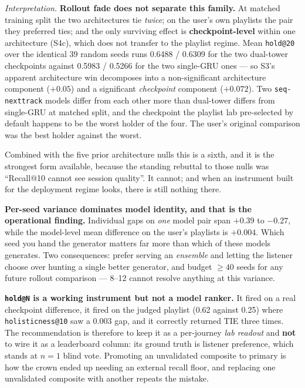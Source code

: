 \documentclass[11pt]{article}
\begin{document}
\emph{Interpretation.} \textbf{Rollout fade does not separate this family.} At
matched training split the two architectures tie \emph{twice}; on the user's own
playlists the pair they preferred ties; and the only surviving effect is
\textbf{checkpoint-level} within one architecture (S4c), which does not transfer to
the playlist regime. Mean \texttt{hold@20} over the identical \num{39} random
seeds runs \num{0.6488} / \num{0.6309} for the two dual-tower checkpoints against
\num{0.5983} / \num{0.5266} for the two single-GRU ones --- so S3's apparent
architecture win decomposes into a non-significant architecture component
($+\num{0.05}$) and a significant \emph{checkpoint} component ($+\num{0.072}$).
Two \texttt{seq-nexttrack} models differ from each other more than dual-tower
differs from single-GRU at matched split, and the checkpoint the playlist lab
pre-selected by default happens to be the worst holder of the four. The user's
original comparison was the best holder against the worst.

Combined with the five prior architecture nulls this is a sixth, and it is the
strongest form available, because the standing rebuttal to those nulls was
``Recall@10 cannot see session quality''. It cannot; and when an instrument built
for the deployment regime looks, there is still nothing there.

\textbf{Per-seed variance dominates model identity, and that is the operational
finding.} Individual gaps on \emph{one} model pair span $+\num{0.39}$ to
$-\num{0.27}$, while the model-level mean difference on the user's playlists is
$+\num{0.004}$. Which seed you hand the generator matters far more than which of
these models generates. Two consequences: prefer serving an \emph{ensemble} and
letting the listener choose over hunting a single better generator, and budget
$\ge\num{40}$ seeds for any future rollout comparison --- \numrange{8}{12} cannot
resolve anything at this variance.

\textbf{\texttt{hold@N} is a working instrument but not a model ranker.} It fired
on a real checkpoint difference, it fired on the judged playlist (\num{0.62}
against \num{0.25}) where \texttt{holisticness@10} saw a \num{0.003} gap, and it
correctly returned TIE three times. The recommendation is therefore to keep it as
a per-journey \emph{lab readout} and \textbf{not} to wire it as a leaderboard
column: its ground truth is listener preference, which stands at $n=1$ blind vote.
Promoting an unvalidated composite to primary is how the crown ended up needing an
external recall floor, and replacing one unvalidated composite with another repeats
the mistake.
\end{document}
